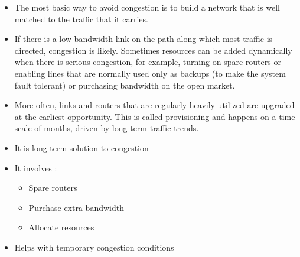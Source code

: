 \documentclass[twoside]{article}
\begin{document}
\begin{itemize}
    \item The most basic way to avoid congestion is to build a network that is
well matched to the traffic that it carries.
    \item If there is a low-bandwidth link on the path along which most traffic
is directed, congestion is likely. Sometimes resources can be added
dynamically when there is serious congestion, for example, turning on
spare routers or enabling lines that are normally used only as backups
(to make the system fault tolerant) or purchasing bandwidth on the
open market.
    \item More often, links and routers that are regularly heavily utilized are
upgraded at the earliest opportunity. This is called provisioning and
happens on a time scale of months, driven by long-term traffic trends.
    \item It is long term solution to congestion
    \item It involves :
    \begin{itemize}
        \item Spare routers
        \item Purchase extra bandwidth
        \item Allocate resources
    \end{itemize}
    \item Helps with temporary congestion conditions
\end{itemize}
\end{document}
